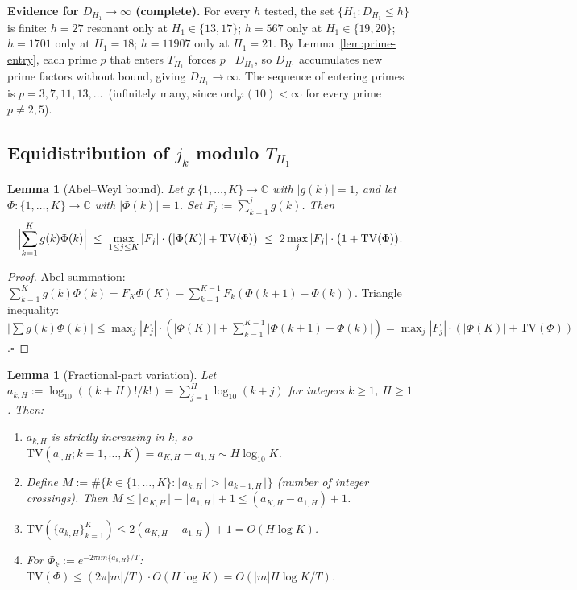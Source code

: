 \documentclass[
]{article}
\newtheorem{lemma}[theorem]{Lemma}
\begin{document}
\noindent\textbf{Evidence for $D_{H_1}\to\infty$ (complete).}
For every $h$ tested, the set $\{H_1:D_{H_1}\le h\}$ is finite:
$h=27$ resonant only at $H_1\in\{13,17\}$;
$h=567$ only at $H_1\in\{19,20\}$;
$h=1701$ only at $H_1=18$;
$h=11907$ only at $H_1=21$.
By Lemma~\ref{lem:prime-entry}, each prime $p$ that enters $T_{H_1}$
forces $p\mid D_{H_1}$, so $D_{H_1}$ accumulates new prime factors without bound,
giving $D_{H_1}\to\infty$.
The sequence of entering primes is $p=3,7,11,13,\ldots$\ (infinitely many,
since $\mathrm{ord}_{p^2}(10)<\infty$ for every prime $p\ne 2,5$).

\subsection{Equidistribution of $j_k$ modulo $T_{H_1}$}
\label{sec:aci-jk}

\begin{lemma}[Abel--Weyl bound]\label{lem:abel-weyl}
Let $g:\{1,\ldots,K\}\to\mathbb{C}$ with $|g(k)|=1$, and let
$\Phi:\{1,\ldots,K\}\to\mathbb{C}$ with $|\Phi(k)|=1$.
Set $F_j:=\sum_{k=1}^j g(k)$.  Then
\[
  \Bigl|\sum_{k=1}^K g(k)\Phi(k)\Bigr|
  \;\le\;\max_{1\le j\le K}|F_j|\cdot\bigl(|\Phi(K)|+\mathrm{TV}(\Phi)\bigr)
  \;\le\;2\max_{j}|F_j|\cdot\bigl(1+\mathrm{TV}(\Phi)\bigr).
\]
\end{lemma}

\begin{proof}
Abel summation: $\sum_{k=1}^K g(k)\Phi(k)=F_K\Phi(K)-\sum_{k=1}^{K-1}F_k(\Phi(k+1)-\Phi(k))$.
Triangle inequality:
$|\sum g(k)\Phi(k)|\le\max_j|F_j|\cdot(|\Phi(K)|+\sum_{k=1}^{K-1}|\Phi(k+1)-\Phi(k)|)
=\max_j|F_j|\cdot(|\Phi(K)|+\mathrm{TV}(\Phi))$.\hfill$\square$
\end{proof}

\begin{lemma}[Fractional-part variation]\label{lem:frac-part-tv}
Let $a_{k,H}:=\log_{10}((k+H)!/k!)=\sum_{j=1}^H\log_{10}(k+j)$
for integers $k\ge 1$, $H\ge 1$.  Then:
\begin{enumerate}
\item[\emph{(i)}] $a_{k,H}$ is strictly increasing in $k$, so
  $\mathrm{TV}(a_{\cdot,H};k=1,\ldots,K)=a_{K,H}-a_{1,H}\sim H\log_{10}K$.
\item[\emph{(ii)}] Define $M:=\#\{k\in\{1,\ldots,K\}:\lfloor a_{k,H}\rfloor
  >\lfloor a_{k-1,H}\rfloor\}$ (number of integer crossings).
  Then $M\le\lfloor a_{K,H}\rfloor-\lfloor a_{1,H}\rfloor+1
  \le(a_{K,H}-a_{1,H})+1$.
\item[\emph{(iii)}] $\mathrm{TV}(\{a_{k,H}\}_{k=1}^K)\le 2(a_{K,H}-a_{1,H})+1=O(H\log K)$.
\item[\emph{(iv)}] For $\Phi_k:=e^{-2\pi im\{a_{k,H}\}/T}$:
  $\mathrm{TV}(\Phi)\le(2\pi|m|/T)\cdot O(H\log K)=O(|m|H\log K/T)$.
\end{enumerate}
\end{lemma}
\end{document}
